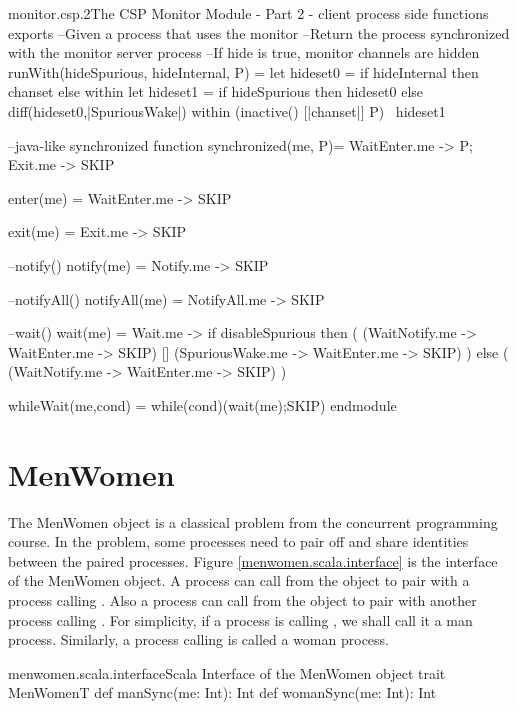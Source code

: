 \documentclass[a4paper, 12pt]{article}
\begin{document}
\begin{cspfloat}{monitor.csp.2}{The CSP Monitor Module - Part 2 - client process side functions}
exports
  --Given a process that uses the monitor
  --Return the process synchronized with the monitor server process
  --If hide is true, monitor channels are hidden
  runWith(hideSpurious, hideInternal, P) = 
    let hideset0 = if hideInternal then chanset else {} within
    let hideset1 = if hideSpurious then hideset0 
                   else diff(hideset0,{|SpuriousWake|}) within
    (inactive({}) [|chanset|] P) \ hideset1
  
  --java-like synchronized function
  synchronized(me, P)= WaitEnter.me -> P; Exit.me -> SKIP

  enter(me) = WaitEnter.me -> SKIP

  exit(me) = Exit.me -> SKIP

  --notify()
  notify(me) = Notify.me -> SKIP

  --notifyAll()
  notifyAll(me) = NotifyAll.me -> SKIP

  --wait()
  wait(me) =
    Wait.me -> 
    if disableSpurious then (
      (WaitNotify.me -> WaitEnter.me -> SKIP)
   [] (SpuriousWake.me -> WaitEnter.me -> SKIP)
  ) else (
      (WaitNotify.me -> WaitEnter.me -> SKIP)
  )
  
  whileWait(me,cond) = while(cond)(wait(me);SKIP)
endmodule
\end{cspfloat}

\newpage
\section{MenWomen}
The MenWomen object is a classical problem from the concurrent programming course. In the problem, some processes need to pair off and share identities between the paired processes. Figure \ref{menwomen.scala.interface} is the interface of the MenWomen object. A process can call  from the object to pair with a process calling . Also a process can call  from the object to pair with another process calling . For simplicity, if a process is calling , we shall call it a man process. Similarly, a process calling  is called a woman process.

\begin{scalainline}{menwomen.scala.interface}{Scala Interface of the MenWomen object}
trait MenWomenT{
  def manSync(me: Int): Int
  def womanSync(me: Int): Int
}
\end{scalainline}
\end{document}
